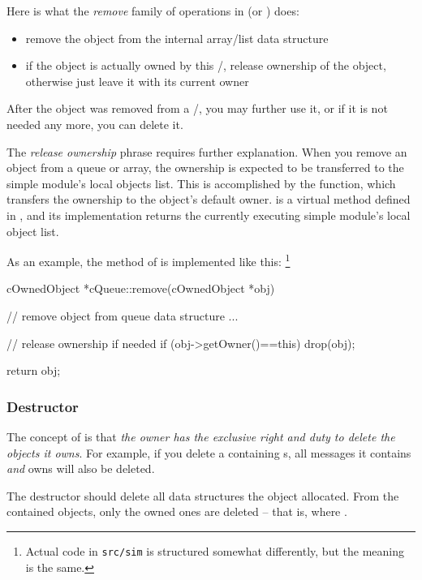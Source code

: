 Here is what the \textit{remove} family of operations in 
(or ) does:

\begin{itemize}
    \item{remove the object from the internal array/list data structure}

    \item{if the object is actually owned by this /,
    release ownership of the object, otherwise just leave it with
    its current owner}
\end{itemize}

After the object was removed from a /,
you may further use it, or if it is not needed any more, you can delete it.

The \textit{release ownership} phrase requires further explanation.
When you remove an object from a queue or array, the ownership
is expected to be transferred to the simple module's local objects list.
This is accomplished by the  function, which transfers the
ownership to the object's default owner.
 is a virtual method defined in ,
and its implementation returns
the currently executing simple module's local object list.

As an example, the  method of  is
implemented like this:
  \footnote{Actual code in \texttt{src/sim} is structured somewhat
  differently, but the meaning is the same.}

\begin{cpp}
cOwnedObject *cQueue::remove(cOwnedObject *obj)
{
    // remove object from queue data structure
    ...

    // release ownership if needed
    if (obj->getOwner()==this)
        drop(obj);

    return obj;
}
\end{cpp}


\subsubsection{Destructor}

The concept of  is that \textit{the owner has the
exclusive right and duty to delete the objects it owns}.
For example, if you delete a  containing s,
all messages it contains \textit{and} owns will also be deleted.

The destructor should delete all data structures the object allocated.
From the contained objects, only the owned ones are deleted -- that is,
where .


